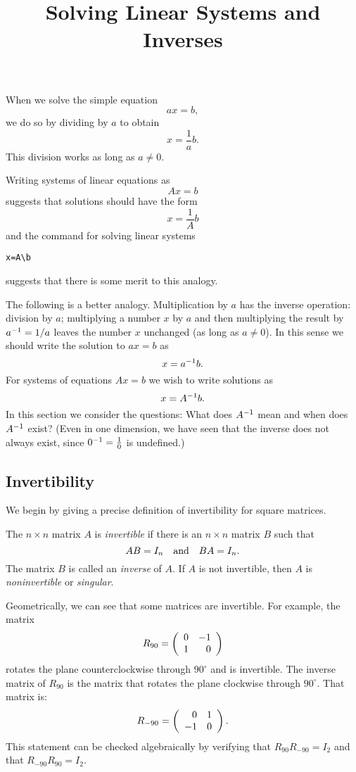 \documentclass{ximera}
\title{Solving Linear Systems and Inverses}
\begin{document}
\begin{abstract}
\end{abstract}
\maketitle

 \label{S:SLS}

When we solve the simple equation
\[
ax=b,
\]
we do so by dividing by $a$ to obtain
\[
x=\frac{1}{a}b.
\]
This division works as long as $a\neq 0$.

Writing systems of linear equations as
\[
Ax=b
\]
suggests that solutions should have the form
\[
x=\frac{1}{A} b
\]
and the \Matlab command for solving linear systems
\begin{verbatim}
x=A\b
\end{verbatim}
suggests that there is some merit to this analogy.

The following is a better analogy.  Multiplication by $a$ has the
inverse operation: division by $a$; multiplying a number $x$ by
$a$ and then multiplying the result by $a^{-1}=1/a$ leaves the number
$x$ unchanged (as long as $a\neq 0$).  In this sense we should
write the solution to $ax=b$ as
\[
x=a^{-1} b.
\]
For systems of equations $Ax=b$ we wish to write solutions as
\[
x=A^{-1} b.
\]
In this section we consider the questions: What does $A^{-1}$
mean and when does $A^{-1}$ exist? (Even in one dimension, we
have seen that the inverse does not always exist, since
$0^{-1}=\frac{1}{0}$ is undefined.)

\subsection*{Invertibility}

We begin by giving a precise definition of invertibility for square matrices.
\begin{definition} \label{inverse}  
The $n\times n$ matrix $A$ is {\em invertible\/} if there is an $n\times n$
matrix $B$ such that
\[
AB=I_n \quad\mbox{and}\quad BA=I_n.
\]
The matrix $B$ is called an {\em inverse\/} of $A$.  If $A$ is not invertible,
then $A$ is {\em noninvertible\/} or {\em singular\/}. 
\end{definition}

Geometrically, we can see that some matrices are invertible.  For example, 
the matrix
\[
R_{90} = \left(\begin{array}{rr} 0 & -1\\ 1 &0\end{array}\right)
\]
rotates the plane counterclockwise through $90^\circ$ and is
invertible.  The inverse matrix of $R_{90}$ is the matrix that rotates the
plane clockwise through $90^\circ$.  That matrix is:
\[
R_{-90} = \left(\begin{array}{rr} 0 & 1\\ -1 &0\end{array}\right).
\]
This statement can be checked algebraically by verifying that 
$R_{90}R_{-90}=I_2$ and that $R_{-90}R_{90} = I_2$.
\end{document}
